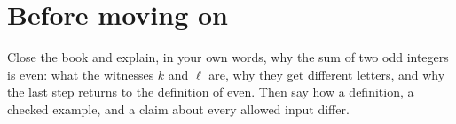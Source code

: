 \section*{Before moving on}
Close the book and explain, in your own words, why the sum of two odd integers is even: what the witnesses $k$ and $\ell$ are, why they get different letters, and why the last step returns to the definition of even. Then say how a definition, a checked example, and a claim about every allowed input differ.
